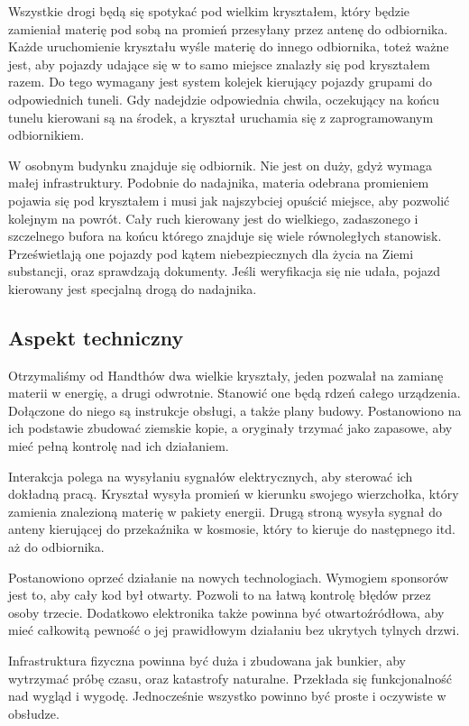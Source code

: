 Wszystkie drogi będą się spotykać pod wielkim kryształem, który będzie zamieniał materię pod sobą na promień przesyłany przez antenę do odbiornika.
Każde uruchomienie kryształu wyśle materię do innego odbiornika, toteż ważne jest, aby pojazdy udające się w to samo miejsce znalazły się pod kryształem razem.
Do tego wymagany jest system kolejek kierujący pojazdy grupami do odpowiednich tuneli.
Gdy nadejdzie odpowiednia chwila, oczekujący na końcu tunelu kierowani są na środek, a kryształ uruchamia się z zaprogramowanym odbiornikiem.

W osobnym budynku znajduje się odbiornik.
Nie jest on duży, gdyż wymaga małej infrastruktury.
Podobnie do nadajnika, materia odebrana promieniem pojawia się pod kryształem i musi jak najszybciej opuścić miejsce, aby pozwolić kolejnym na powrót.
Cały ruch kierowany jest do wielkiego, zadaszonego i szczelnego bufora na końcu którego znajduje się wiele równoległych stanowisk.
Prześwietlają one pojazdy pod kątem niebezpiecznych dla życia na Ziemi substancji, oraz sprawdzają dokumenty.
Jeśli weryfikacja się nie udała, pojazd kierowany jest specjalną drogą do nadajnika.

\subsection{Aspekt techniczny}
Otrzymaliśmy od Handthów dwa wielkie kryształy, jeden pozwalał na zamianę materii w energię, a drugi odwrotnie. 
Stanowić one będą rdzeń całego urządzenia. 
Dołączone do niego są instrukcje obsługi, a także plany budowy.
Postanowiono na ich podstawie zbudować ziemskie kopie, a oryginały trzymać jako zapasowe, aby mieć pełną kontrolę nad ich działaniem.

Interakcja polega na wysyłaniu sygnałów elektrycznych, aby sterować ich dokładną pracą.
Kryształ wysyła promień w kierunku swojego wierzchołka, który zamienia znalezioną materię w pakiety energii.
Drugą stroną wysyła sygnał do anteny kierującej do przekaźnika w kosmosie, który to kieruje do następnego itd. aż do odbiornika.

Postanowiono oprzeć działanie na nowych technologiach.
Wymogiem sponsorów jest to, aby cały kod był otwarty.
Pozwoli to na łatwą kontrolę błędów przez osoby trzecie.
Dodatkowo elektronika także powinna być otwartoźródłowa, aby mieć całkowitą pewność o jej prawidłowym działaniu bez ukrytych tylnych drzwi.

Infrastruktura fizyczna powinna być duża i zbudowana jak bunkier, aby wytrzymać próbę czasu, oraz katastrofy naturalne.
Przekłada się funkcjonalność nad wygląd i wygodę.
Jednocześnie wszystko powinno być proste i oczywiste w obsłudze.

